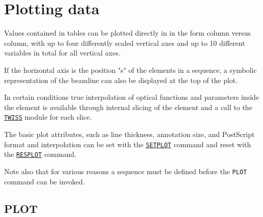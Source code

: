 
\chapter{Plotting data}
\label{chap:plot}

Values contained in \madx tables can be plotted directly in \madx in the
form column versus column, with up to four differently scaled vertical
axes and up to 10 different variables in total for all vertical axes.

If the horizontal axis is the position "s" of the elements
in a sequence, a symbolic representation of the beamline can also
be displayed at the top of the plot. 

In certain conditions true interpolation of optical functions and
parameters inside the element is available through internal slicing of
the element and a call to the \hyperref[chap:twiss]{\tt TWISS} module
for each slice. 

The basic plot attributes, such as line thickness, annotation size,
and PostScript format and interpolation can be set with the
\hyperref[sec:setplot]{\tt SETPLOT} command and reset with the
\hyperref[sec:resplot]{\tt RESPLOT} command.

Note also that for various reasons a sequence must be defined before the 
{\tt PLOT} command can be invoked. 

\section{PLOT}	
\label{sec:plot}


